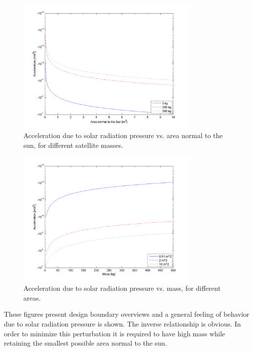\begin{figure}[ht!]
\centering
\includegraphics[width=0.8\textwidth, angle=0]{chapters/img/solPressureVarArea.png}
\caption{Acceleration due to solar radiation pressure vs. area normal to the sun, for different satellite masses.}
\label{fig:solarRadArea}
\end{figure}

\begin{figure}[ht!]
\centering
\includegraphics[width=0.8\textwidth, angle=0]{chapters/img/solPressureVarMass.png}
\caption{Acceleration due to solar radiation pressure vs. mass, for different areas.}
\label{fig:solarRadMass}
\end{figure}

These figures present design boundary overviews and a general feeling of behavior due to solar radiation pressure is shown. The inverse relationship is obvious. In order to minimize this perturbation it is required to have high mass while retaining the smallest possible area normal to the sun.

